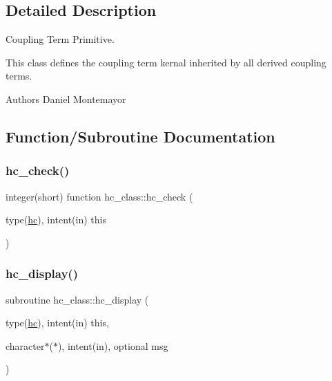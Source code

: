 \subsection{Detailed Description}
Coupling Term Primitive. 

This class defines the coupling term kernal inherited by all derived coupling terms. \begin{DoxyAuthor}{Authors}
Daniel Montemayor 
\end{DoxyAuthor}


\subsection{Function/\+Subroutine Documentation}
\mbox{\label{namespacehc__class_ad0b55c92720ef59cfd8b4cecd194afe1}} 
\subsubsection{\texorpdfstring{hc\+\_\+check()}{hc\_check()}}
{\footnotesize\ttfamily integer(short) function hc\+\_\+class\+::hc\+\_\+check (\begin{DoxyParamCaption}\item[{type(\hyperlink{structhc__class_1_1hc}{hc}), intent(in)}]{this }\end{DoxyParamCaption})\hspace{0.3cm}{\ttfamily [private]}}

\mbox{\label{namespacehc__class_a484af233bb8b65db73534ae297fa7346}} 
\subsubsection{\texorpdfstring{hc\+\_\+display()}{hc\_display()}}
{\footnotesize\ttfamily subroutine hc\+\_\+class\+::hc\+\_\+display (\begin{DoxyParamCaption}\item[{type(\hyperlink{structhc__class_1_1hc}{hc}), intent(in)}]{this,  }\item[{character$\ast$($\ast$), intent(in), optional}]{msg }\end{DoxyParamCaption})\hspace{0.3cm}{\ttfamily [private]}}

